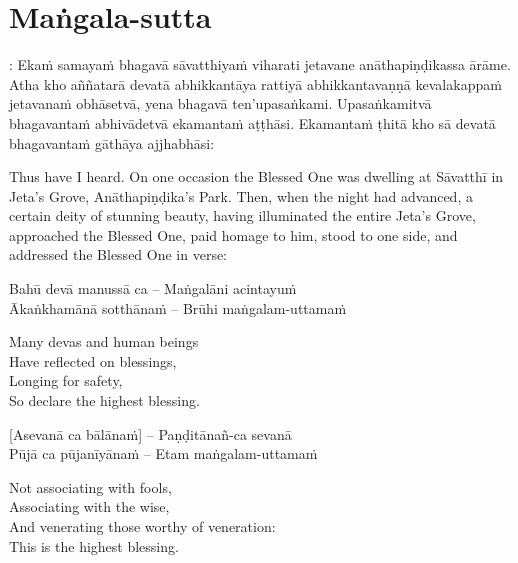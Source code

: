 \suttaRef{[Thai]}

\section{Maṅgala-sutta}
\label{mangala-sutta}

\vspace{-1em}

\begin{pali-hang}
: Ekaṁ samayaṁ bhagavā sāvatthiyaṁ viharati jetavane anāthapiṇḍikassa ārāme. Atha kho aññatarā devatā abhikkantāya rattiyā abhikkantavaṇṇā kevalakappaṁ jetavanaṁ obhāsetvā, yena bhagavā ten'upasaṅkami. Upasaṅkamitvā bhagavantaṁ abhivādetvā ekamantaṁ aṭṭhāsi. Ekamantaṁ ṭhitā kho sā devatā bhagavantaṁ gāthāya ajjhabhāsi:
\end{pali-hang}
\begin{english-hang}
  Thus have I heard. On one occasion the Blessed One was dwelling at Sāvatthī in Jeta's Grove, Anāthapiṇḍika's Park. Then, when the night had advanced, a certain deity of stunning beauty, having illuminated the entire Jeta's Grove, approached the Blessed One, paid homage to him, stood to one side, and addressed the Blessed One in verse:
\end{english-hang}

Bahū devā manussā ca – Maṅgalāni acintayuṁ\\
Ākaṅkhamānā sotthānaṁ – Brūhi maṅgalam-uttamaṁ

\begin{english-verses}
  Many devas and human beings\\
  Have reflected on blessings,\\
  Longing for safety,\\
  So declare the highest blessing.
\end{english-verses}

[Asevanā ca bālānaṁ] – Paṇḍitānañ-ca sevanā\\
Pūjā ca pūjanīyānaṁ – Etam maṅgalam-uttamaṁ

\begin{english-verses}
  Not associating with fools,\\
  Associating with the wise,\\
  And venerating those worthy of veneration:\\
  This is the highest blessing.
\end{english-verses}

